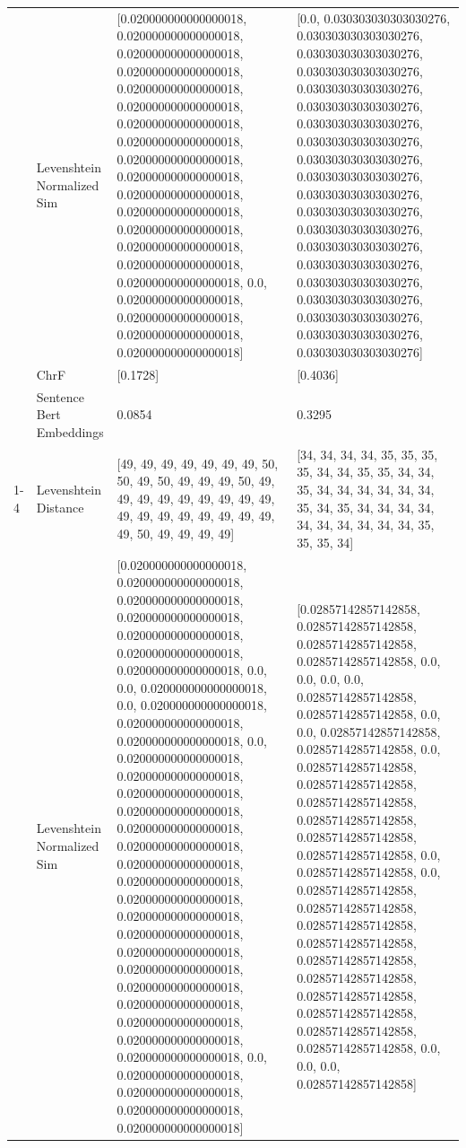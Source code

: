\begin{tabular}{llll}
 & Levenshtein Normalized Sim & [0.020000000000000018, 0.020000000000000018, 0.020000000000000018, 0.020000000000000018, 0.020000000000000018, 0.020000000000000018, 0.020000000000000018, 0.020000000000000018, 0.020000000000000018, 0.020000000000000018, 0.020000000000000018, 0.020000000000000018, 0.020000000000000018, 0.020000000000000018, 0.020000000000000018, 0.020000000000000018, 0.0, 0.020000000000000018, 0.020000000000000018, 0.020000000000000018, 0.020000000000000018] & [0.0, 0.030303030303030276, 0.030303030303030276, 0.030303030303030276, 0.030303030303030276, 0.030303030303030276, 0.030303030303030276, 0.030303030303030276, 0.030303030303030276, 0.030303030303030276, 0.030303030303030276, 0.030303030303030276, 0.030303030303030276, 0.030303030303030276, 0.030303030303030276, 0.030303030303030276, 0.030303030303030276, 0.030303030303030276, 0.030303030303030276, 0.030303030303030276, 0.030303030303030276] \\
 & ChrF & [0.1728] & [0.4036] \\
 & Sentence Bert Embeddings & 0.0854 & 0.3295 \\
\cline{1-4}
\multirow[t]{4}{*}{Kahii ka mwathi kamenyaga kugereka} & Levenshtein Distance & [49, 49, 49, 49, 49, 49, 49, 50, 50, 49, 50, 49, 49, 49, 50, 49, 49, 49, 49, 49, 49, 49, 49, 49, 49, 49, 49, 49, 49, 49, 49, 49, 49, 50, 49, 49, 49, 49] & [34, 34, 34, 34, 35, 35, 35, 35, 34, 34, 35, 35, 34, 34, 35, 34, 34, 34, 34, 34, 34, 35, 34, 35, 34, 34, 34, 34, 34, 34, 34, 34, 34, 34, 35, 35, 35, 34] \\
 & Levenshtein Normalized Sim & [0.020000000000000018, 0.020000000000000018, 0.020000000000000018, 0.020000000000000018, 0.020000000000000018, 0.020000000000000018, 0.020000000000000018, 0.0, 0.0, 0.020000000000000018, 0.0, 0.020000000000000018, 0.020000000000000018, 0.020000000000000018, 0.0, 0.020000000000000018, 0.020000000000000018, 0.020000000000000018, 0.020000000000000018, 0.020000000000000018, 0.020000000000000018, 0.020000000000000018, 0.020000000000000018, 0.020000000000000018, 0.020000000000000018, 0.020000000000000018, 0.020000000000000018, 0.020000000000000018, 0.020000000000000018, 0.020000000000000018, 0.020000000000000018, 0.020000000000000018, 0.020000000000000018, 0.0, 0.020000000000000018, 0.020000000000000018, 0.020000000000000018, 0.020000000000000018] & [0.02857142857142858, 0.02857142857142858, 0.02857142857142858, 0.02857142857142858, 0.0, 0.0, 0.0, 0.0, 0.02857142857142858, 0.02857142857142858, 0.0, 0.0, 0.02857142857142858, 0.02857142857142858, 0.0, 0.02857142857142858, 0.02857142857142858, 0.02857142857142858, 0.02857142857142858, 0.02857142857142858, 0.02857142857142858, 0.0, 0.02857142857142858, 0.0, 0.02857142857142858, 0.02857142857142858, 0.02857142857142858, 0.02857142857142858, 0.02857142857142858, 0.02857142857142858, 0.02857142857142858, 0.02857142857142858, 0.02857142857142858, 0.02857142857142858, 0.0, 0.0, 0.0, 0.02857142857142858] \\

\end{tabular}
